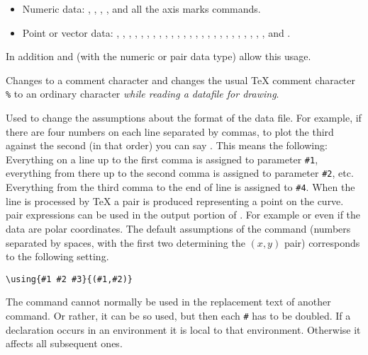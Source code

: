\documentclass[letterpaper]{article}
\begin{document}
\begin{itemize}
\raggedright
\item Numeric data:
    , , ,
    , and all the axis marks commands.
\item Point or vector data:
    , , ,
    , , ,
    , , ,
    , , , ,
    , , ,
    , , , ,
    , , , ,
    , and .
\end{itemize}
In addition  and  (with the numeric or
pair data type) allow this usage.

\begin{cd}
\cs{}%
\end{cd}

Changes  to a comment character and changes the usual \TeX{}
comment character \texttt{\%} to an ordinary character \emph{while reading a
datafile for drawing}.

\begin{cd}
%
\end{cd}

Used to change the assumptions about the format of the data file. For
example, if there are four numbers on each line separated by commas, to
plot the third against the second (in that order) you can say
. This means the
following: Everything on a line up to the first comma is assigned to
parameter \texttt{\#1}, everything from there up to the second comma is
assigned to parameter \texttt{\#2}, etc. Everything from the third comma
to the end of line is assigned to \texttt{\#4}. When the line is
processed by \TeX{} a \MF{} pair is produced representing a point on the
curve. \CMF{} pair expressions can be used in the output portion of
. For example 
or even  if the data
are polar coordinates. The default assumptions of the 
command (numbers separated by spaces, with the first two determining the
$(x,y)$ pair) corresponds to the following setting.
\begin{verbatim}
\using{#1 #2 #3}{(#1,#2)}
\end{verbatim}
The  command cannot normally be used in the replacement text
of another command. Or rather, it can be so used, but then each
\texttt{\#} has to be doubled. If a  declaration occurs in an
 environment it is local to that environment. Otherwise it
affects all subsequent ones.
\end{document}
